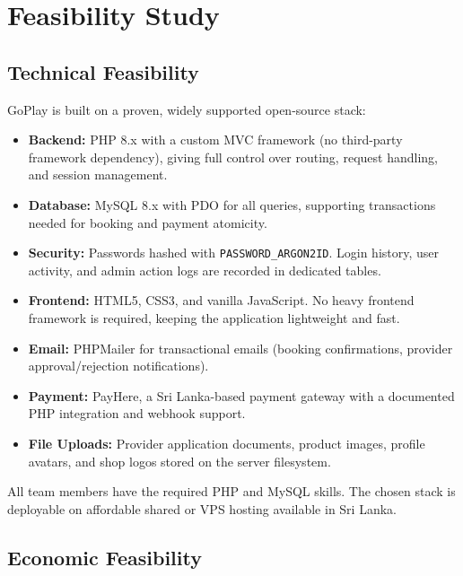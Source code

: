 \documentclass[12pt,a4paper]{report}
\begin{document}
\chapter{Feasibility Study}

\section{Technical Feasibility}

GoPlay is built on a proven, widely supported open-source stack:

\begin{itemize}[leftmargin=1.5cm]
  \item \textbf{Backend:} PHP 8.x with a custom MVC framework (no third-party framework dependency), giving full control over routing, request handling, and session management.
  \item \textbf{Database:} MySQL 8.x with PDO for all queries, supporting transactions needed for booking and payment atomicity.
  \item \textbf{Security:} Passwords hashed with \texttt{PASSWORD\_ARGON2ID}. Login history, user activity, and admin action logs are recorded in dedicated tables.
  \item \textbf{Frontend:} HTML5, CSS3, and vanilla JavaScript. No heavy frontend framework is required, keeping the application lightweight and fast.
  \item \textbf{Email:} PHPMailer for transactional emails (booking confirmations, provider approval/rejection notifications).
  \item \textbf{Payment:} PayHere, a Sri Lanka-based payment gateway with a documented PHP integration and webhook support.
  \item \textbf{File Uploads:} Provider application documents, product images, profile avatars, and shop logos stored on the server filesystem.
\end{itemize}

All team members have the required PHP and MySQL skills. The chosen stack is deployable on affordable shared or VPS hosting available in Sri Lanka.

\section{Economic Feasibility}
\end{document}
